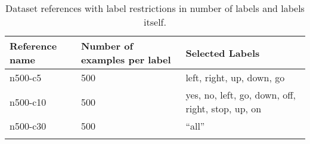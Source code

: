 \begin{table}[ht!]
\begin{center}
\caption{Dataset references with label restrictions in number of labels and labels itself.}
\begin{tabular}{ M{2cm}  M{2cm}  M{5cm} }
\toprule
\textbf{Reference name} & \textbf{Number of examples per label} & \textbf{Selected Labels}\\
\midrule
n500-c5 & 500 & left, right, up, down, go\\
n500-c10 & 500 & yes, no, left, go, down, off, right, stop, up, on\\
n500-c30 & 500 & \enquote{all}\\
\bottomrule
\label{tab:dataset_labels}
\end{tabular}
\end{center}
\end{table}
\FloatBarrier
\noindent
